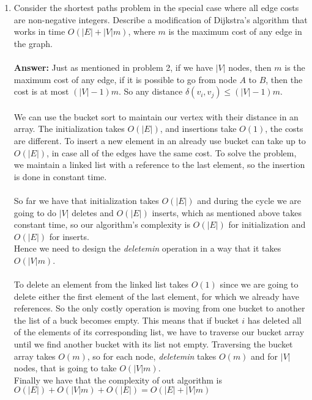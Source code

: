 \documentclass[12pt]{scrartcl}
\begin{document}
\begin{enumerate}
	\item Consider the shortest paths problem in the special case where all edge costs are non-negative integers. Describe a modification of Dijkstra's algorithm that works in time $O(|E| + |V|m)$, where $m$ is the maximum cost of any edge in the graph.\\
	\\
	\textbf{Answer: } Just as mentioned in problem 2, if we have $|V|$ nodes, then $m$ is the maximum cost of any edge, if it is possible to go from node $A$ to $B$, then the cost is at most $(|V| - 1)m$. So any distance $\delta(v_i, v_j) \leq (|V| - 1)m$.\\
	\\
	We can use the bucket sort to maintain our vertex with their distance in an array. The initialization takes $O(|E|)$, and insertions take $O(1)$, the costs are different. To insert a new element in an already use bucket can take up to $O(|E|)$, in case all of the edges have the same cost. To solve the problem, we maintain a linked list with a reference to the last element, so the insertion is done in constant time.\\
	\\
	So far we have that initialization takes $O(|E|)$ and during the cycle we are going to do $|V|$ deletes and $O(|E|)$ inserts, which as mentioned above takes constant time, so our algorithm's complexity is $O(|E|)$ for initialization and $O(|E|)$ for inserts. \\
	Hence we need to design the \textit{deletemin} operation in a way that it takes $O(|V|m)$. \\
	\\
	To delete an element from the linked list takes $O(1)$ since we are going to delete either the first element of the last element, for which we already have references. So the only costly operation is moving from one bucket to another the list of a buck becomes empty. This means that if bucket $i$ has deleted all of the elements of its corresponding list, we have to traverse our bucket array until we find another bucket with its list not empty. Traversing the bucket array takes $O(m)$, so for each node, \textit{deletemin} takes $O(m)$ and for $|V|$ nodes, that is going to take $O(|V|m)$.\\ 
	Finally we have that the complexity of out algorithm is $O(|E|) + O(|V|m) + O(|E|) = O(|E| + |V|m)$
	
	
	

\end{enumerate}
\end{document}
